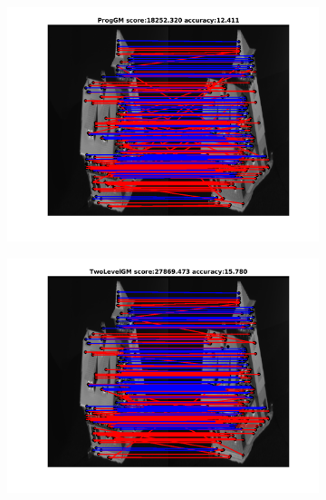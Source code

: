 \documentclass[
	fontsize=12pt,
	paper=a4,
	twoside=false,
	numbers=noenddot,
	plainheadsepline,
	toc=listof,
	toc=bibliography
]{scrartcl}
\begin{document}
\begin{figure}[h] 		
	\begin{subfigure}[b]{0.3\textwidth}
		\centering
		\includegraphics[scale=0.25]{"fig_ver2608/RealImages/HouseSeq/anchor_descr/using_cpd_afftrafo//solution/fi_1_ProgGM"}  
	\end{subfigure}%
	\begin{subfigure}[b]{0.3\textwidth}
		\centering
		\includegraphics[scale=0.25]{"fig_ver2608/RealImages/HouseSeq/anchor_descr/using_cpd_afftrafo/solution/fi_1_TwoLevelGM"}  
	\end{subfigure} 
	\begin{subfigure}[b]{0.3\textwidth}
		\centering

\end{subfigure}
\end{figure}
\end{document}
